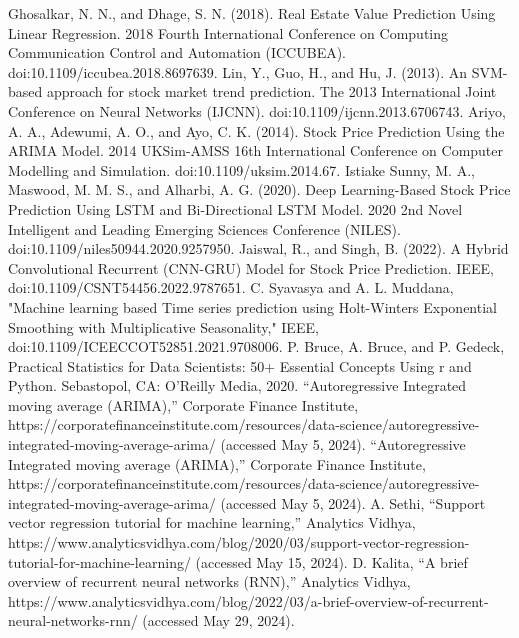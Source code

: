 \documentclass{ieeeojies}
\begin{document}
	\begin{thebibliography}{00}
		 Ghosalkar, N. N., and Dhage, S. N. (2018). Real Estate Value Prediction Using Linear Regression. 2018 Fourth International Conference on Computing Communication Control and Automation (ICCUBEA). doi:10.1109/iccubea.2018.8697639.
		 Lin, Y., Guo, H., and Hu, J. (2013). An SVM-based approach for stock market trend prediction. The 2013 International Joint Conference on Neural Networks (IJCNN). doi:10.1109/ijcnn.2013.6706743.
		 Ariyo, A. A., Adewumi, A. O., and Ayo, C. K. (2014). Stock Price Prediction Using the ARIMA Model. 2014 UKSim-AMSS 16th International Conference on Computer Modelling and Simulation. doi:10.1109/uksim.2014.67.
		 Istiake Sunny, M. A., Maswood, M. M. S., and Alharbi, A. G. (2020). Deep Learning-Based Stock Price Prediction Using LSTM and Bi-Directional LSTM Model. 2020 2nd Novel Intelligent and Leading Emerging Sciences Conference (NILES). doi:10.1109/niles50944.2020.9257950.
		 Jaiswal, R., and Singh, B. (2022). A Hybrid Convolutional Recurrent (CNN-GRU) Model for Stock Price Prediction. IEEE, doi:10.1109/CSNT54456.2022.9787651.
		 C. Syavasya and A. L. Muddana, "Machine learning based Time series prediction using Holt-Winters Exponential Smoothing with Multiplicative Seasonality," IEEE, doi:10.1109/ICEECCOT52851.2021.9708006.
		 P. Bruce, A. Bruce, and P. Gedeck, Practical Statistics for Data Scientists: 50+ Essential Concepts Using r and Python. Sebastopol, CA: O’Reilly Media, 2020. 
		 “Autoregressive Integrated moving average (ARIMA),” Corporate Finance Institute, https://corporatefinanceinstitute.com/resources/data-science/autoregressive-integrated-moving-average-arima/ (accessed May 5, 2024). 
		 “Autoregressive Integrated moving average (ARIMA),” Corporate Finance Institute, https://corporatefinanceinstitute.com/resources/data-science/autoregressive-integrated-moving-average-arima/ (accessed May 5, 2024).
		 A. Sethi, “Support vector regression tutorial for machine learning,” Analytics Vidhya, https://www.analyticsvidhya.com/blog/2020/03/support-vector-regression-tutorial-for-machine-learning/ (accessed May 15, 2024). 
		 D. Kalita, “A brief overview of recurrent neural networks (RNN),” Analytics Vidhya, https://www.analyticsvidhya.com/blog/2022/03/a-brief-overview-of-recurrent-neural-networks-rnn/ (accessed May 29, 2024). 

\end{thebibliography}
\end{document}
